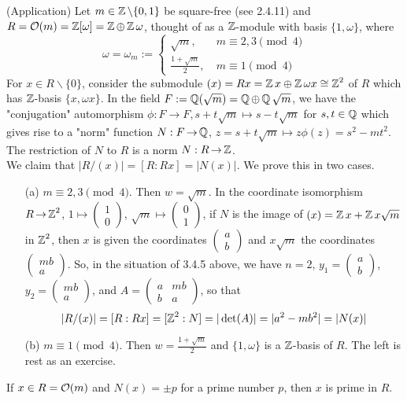 \documentclass[11pt]{book}
\theoremstyle{definition}   \newtheorem{defn}[counter]{Definition} %
\newcommand{\bs}{\backslash}   \newcommand{\A}{\mathcal{A}}   \newcommand{\sy}{\textnormal{Syl}}   \newcommand{\size}[1]{\left| #1 \right|}
\newcommand{\mymatrix}[2]{\left( \begin{array}{#1} #2 \end{array} \right)}
\DeclareMathOperator{\ra}{\rightarrow}   \DeclareMathOperator{\Poly}{\mathbf{P}}   \DeclareMathOperator{\spn}{\textnormal{span}}   \DeclareMathOperator{\aut}{\textnormal{Aut}}
\newcommand{\vs}{\vspace{8pt}}
\numberwithin{counter}{chapter}
\begin{document}
\begin{remark}(Application)
Let $m \in \z \bs\{0,1\}$ be square-free (see 2.4.11) and $R = \mathcal{O}(m) = \operatorname{\mathbb{Z}}[\omega] = \operatorname{\mathbb{Z}} \oplus \operatorname{\mathbb{Z}}\omega$, thought of as a $\operatorname{\mathbb{Z}}$-module with basis $\{1,\omega\}$, where
	\[\omega = \omega_m := \begin{cases}
	\sqrt{m}, \quad & m \equiv 2,3 \pmod{4}\\
	\frac{1+\sqrt{m}}{2}, & m \equiv 1 \pmod{4}
	\end{cases} \]
For $x \in R\bs\{0\}$, consider the submodule $(x) = Rx = \operatorname{\mathbb{Z}} x \oplus \operatorname{\mathbb{Z}} \omega x \cong \operatorname{\mathbb{Z}}^2$ of $R$ which has $\operatorname{\mathbb{Z}}$-basis $\{x,\omega x\}$. In the field $F := \operatorname{\mathbb{Q}}(\sqrt{m}) = \operatorname{\mathbb{Q}} \oplus \operatorname{\mathbb{Q}} \sqrt{m}$, we have the "conjugation" automorphism $\phi : F \ra F, s+t \sqrt{m} \mapsto s-t\sqrt{m}$ for $s,t \in \operatorname{\mathbb{Q}}$ which gives rise to a "norm" function $N : F \ra \Q$, $z = s+t \sqrt{m} \mapsto z \phi(z) = s^2 - mt^2$. The restriction of $N$ to $R$ is a norm $N : R \ra \z$. \\

We claim that $|R/(x)| = [R : Rx] = |N(x)|$. We prove this in two cases.
\begin{enumerate}
\item[(a)] $m \equiv 2,3 \pmod{4}$. Then $w = \sqrt{m}$. In the coordinate isomorphism $R \ra \z^2$, $1 \mapsto \mymatrix{c}{1 \\ 0}$, $\sqrt{m} \mapsto \mymatrix{c}{0 \\ 1}$, if $N$ is the image of $(x) = \operatorname{\mathbb{Z}} x + \operatorname{\mathbb{Z}} x\sqrt{m}$ in $\operatorname{\mathbb{Z}}^2$, then $x$ is given the coordinates $\mymatrix{c}{a \\ b}$ and $x \sqrt{m}$ the coordinates $\mymatrix{c}{mb \\ a}$. So, in the situation of 3.4.5 above, we have $n = 2$, $y_1 = \mymatrix{c}{a \\ b}$, $y_2 = \mymatrix{c}{mb \\ a}$, and $A = \mymatrix{cc}{a & mb \\ b & a}$, so that
\[|R/(x)| = [R : Rx] = [\operatorname{\mathbb{Z}}^2 : N] = |\det(A)| = |a^2 - mb^2| = |N(x)| \]

\item[(b)] $m \equiv 1 \pmod{4}$. Then $w = \frac{1 + \sqrt{m}}{2}$ and $\{1,\omega\}$ is a $\operatorname{\mathbb{Z}}$-basis of $R$. The left is rest as an exercise.
\end{enumerate}
\end{remark}

\vs

\noindent {} If $x \in R = \mathcal{O}(m)$ and $N(x) = \pm p$ for a prime number $p$, then $x$ is prime in $R$. \\
\end{document}
